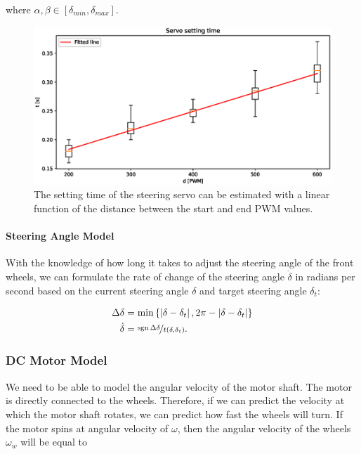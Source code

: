 where $\alpha,\beta\in\left[\delta_{min}, \delta_{max}\right]$.

\begin{figure}
	\includegraphics[width=\textwidth]{../img/servo_setting_time_linreg.eps}
	\caption{The setting time of the steering servo can be estimated with a linear function of the distance between the start and end PWM values.}
	\label{fig:servo_linear_regression}
\end{figure}

\paragraph{Steering Angle Model}

With the knowledge of how long it takes to adjust the steering angle of the front wheels, we can formulate the rate of change of the steering angle $\dot{\delta}$ in radians per second based on the current steering angle $\delta$ and target steering angle $\delta_t$:

\begin{equation}[h!]
\begin{aligned}
\Delta \delta&=\min\left\{\abs{\delta-\delta_t}, 2\pi-\abs{\delta-\delta_t}\right\}\\
\dot{\delta}&=\nicefrac{\sign{} \Delta \delta}{t(\delta, \delta_t)}.
\end{aligned}
\end{equation}

\subsubsection{DC Motor Model}

We need to be able to model the angular velocity of the motor shaft. The motor is directly connected to the wheels. Therefore, if we can predict the velocity at which the motor shaft rotates, we can predict how fast the wheels will turn. If the motor spins at angular velocity of $\omega$, then the angular velocity of the wheels $\omega_w$ will be equal to

